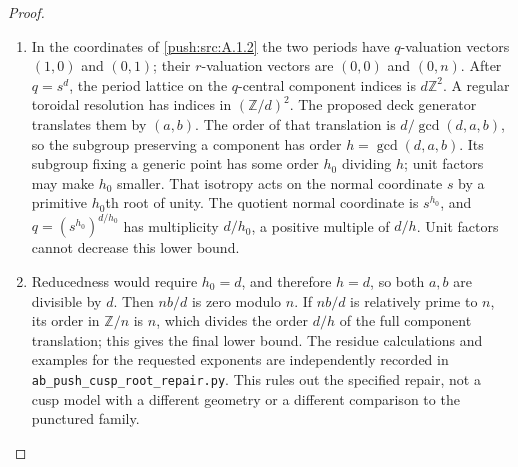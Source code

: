 \begin{proof}
\begin{enumerate}[label=\arabic*.,leftmargin=*]
\item In the coordinates of \ref{push:src:A.1.2} the two
periods have $q$-valuation vectors
$(1,0)$ and $(0,1)$; their $r$-valuation
vectors are $(0,0)$ and $(0,n)$.
After $q=s^d$, the period lattice on
the $q$-central component indices is
$d\mathbb Z^2$. A regular toroidal
resolution has indices in
$(\mathbb Z/d)^2$. The proposed deck
generator translates them by $(a,b)$.
The order of that translation is
$d/\gcd(d,a,b)$, so the subgroup
preserving a component has order
$h=\gcd(d,a,b)$. Its subgroup fixing
a generic point has some order
$h_0$ dividing $h$; unit factors may
make $h_0$ smaller. That isotropy
acts on the normal coordinate $s$
by a primitive $h_0$th root of
unity. The quotient normal
coordinate is $s^{h_0}$, and
$q=(s^{h_0})^{d/h_0}$ has
multiplicity $d/h_0$, a positive
multiple of $d/h$. Unit factors
cannot decrease this lower bound.

\item Reducedness would require $h_0=d$,
and therefore $h=d$,
so both $a,b$ are divisible by $d$.
Then $nb/d$ is zero modulo $n$.
If $nb/d$ is relatively prime to
$n$, its order in $\mathbb Z/n$
is $n$, which divides the order
$d/h$ of the full component
translation; this gives the final
lower bound. The residue calculations
and examples for the requested
exponents are independently recorded
in \texttt{ab\_push\_cusp\_root\_repair.py}.
This rules out the specified repair,
not a cusp model with a different
geometry or a different comparison
to the punctured family.
\end{enumerate}
\end{proof}

